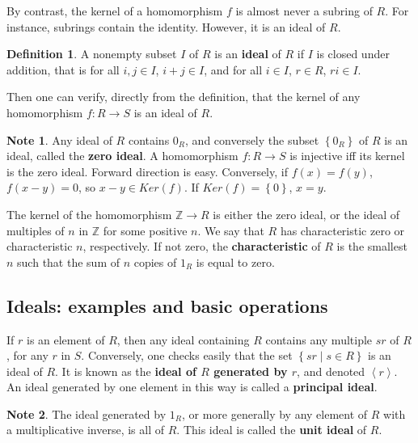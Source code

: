 \documentclass{article}
\newcommand{\Z}{\mathbb{Z}}
\newcommand{\rb}[1]{\left( #1 \right)}
\newcommand{\cb}[1]{\left\{ #1 \right\}}
\newcommand{\ab}[1]{\left\langle #1 \right\rangle}
\theoremstyle{definition}\newtheorem{definition}{Definition}[subsection]
\theoremstyle{definition}\newtheorem{remark}[definition]{Remark}
\theoremstyle{definition}\newtheorem*{example}{Example}
\theoremstyle{definition}\newtheorem*{note}{Note}
\begin{document}
By contrast, the kernel of a homomorphism $ f $ is almost never a subring of $ R $. For instance, subrings contain the identity. However, it is an ideal of $ R $.


\begin{definition}
A nonempty subset $ I $ of $ R $ is an \textbf{ideal} of $ R $ if $ I $ is closed under addition, that is for all $ i, j \in I $, $ i + j \in I $, and for all $ i \in I $, $ r \in R $, $ ri \in I $.
\end{definition}

Then one can verify, directly from the definition, that the kernel of any homomorphism $ f : R \to S $ is an ideal of $ R $.

\begin{note}
Any ideal of $ R $ contains $ 0_R $, and conversely the subset $ \cb{0_R} $ of $ R $ is an ideal, called the \textbf{zero ideal}. A homomorphism $ f : R \to S $ is injective iff its kernel is the zero ideal. Forward direction is easy. Conversely, if $ f\rb{x} = f\rb{y} $, $ f\rb{x - y} = 0 $, so $ x - y \in Ker\rb{f} $. If $ Ker\rb{f} = \cb{0} $, $ x = y $.
\end{note}

The kernel of the homomorphism $ \Z \to R $ is either the zero ideal, or the ideal of multiples of $ n $ in $ \Z $ for some positive $ n $. We say that $ R $ has characteristic zero or characteristic $ n $, respectively. If not zero, the \textbf{characteristic} of $ R $ is the smallest $ n $ such that the sum of $ n $ copies of $ 1_R $ is equal to zero.

\subsection{Ideals: examples and basic operations}

If $ r $ is an element of $ R $, then any ideal containing $ R $ contains any multiple $ sr $ of $ R $, for any $ r $ in $ S $. Conversely, one checks easily that the set $ \cb{sr \mid s \in R} $ is an ideal of $ R $. It is known as the \textbf{ideal of $ R $ generated by $ r $}, and denoted $ \ab{r} $. An ideal generated by one element in this way is called a \textbf{principal ideal}.

\begin{note}
The ideal generated by $ 1_R $, or more generally by any element of $ R $ with a multiplicative inverse, is all of $ R $. This ideal is called the \textbf{unit ideal} of $ R $.
\end{note}
\end{document}
